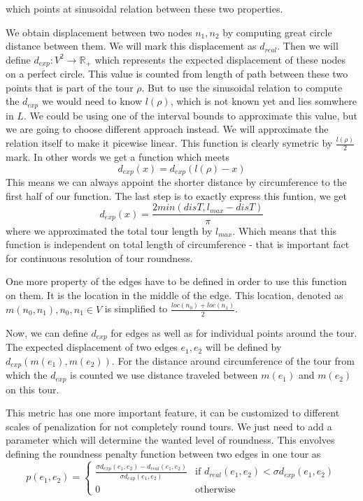 \documentclass{ctuthesis}
\begin{document}
which points at sinusoidal relation between these two properties.\par
We obtain displacement between two nodes \(n_1, n_2\) by computing great circle distance between them. We will mark this displacement as \(d_{real}\). Then we will define \(d_{exp}: V^2 \rightarrow \mathbb{R_+}\) which represents the expected displacement of these nodes on a perfect circle. This value is counted from length of path between these two points that is part of the tour \(\rho\). But to use the sinusoidal relation to compute the \(d_{exp}\) we would need to know \(l(\rho)\), which is not known yet and lies somwhere in \(L\). We could be using one of the interval bounds to approximate this value, but we are going to choose different approach instead. We will approximate the relation itself to make it picewise linear. This function is clearly symetric by \(\frac {l(\rho)} {2}\) mark. In other words we get a function which meets 
\begin{equation}
d_{exp}(x) = d_{exp}(l(\rho)-x)
\end{equation}
This means we can always appoint the shorter distance by circumference to the first half of our function. The last step is to exactly express this funtion, we get
\begin{equation} d_{exp}(x)=\frac{2 min(disT, l_{max}-disT)} {\pi}
\end{equation}
where we approximated the total tour length by \(l_{max}\). Which means that this function is independent on total length of circumference - that is important fact for continuous resolution of tour roundness.\par
One more property of the edges have to be defined in order to use this function on them.
It is the location in the middle of the edge. This location, denoted as \(m(n_0, n_1), n_0, n_1 \in V\) is simplified to \(\frac {loc(n_0)+loc(n_1)} 2\). \par
Now, we can define \(d_{exp}\) for edges as well as for individual points around the tour. The expected displacement of two edges \(e_1, e_2\) will be defined by \(d_{exp}(m(e_1), m(e_2))\). For the distance around circumference of the tour from which the \(d_{exp}\) is counted we use distance traveled between \(m(e_1)\) and \(m(e_2)\) on this tour. \par
This metric has one more important feature, it can be customized to different scales of penalization for not completely round tours. We just need to add a parameter which will determine the wanted level of roundness. This envolves defining the roundness penalty function between two edges in one tour as
\vbox{%
\begin{equation}
	p(e_1, e_2) = \begin{cases}
		\frac 
			{\sigma d_{exp}(e_1, e_2)-d_{real}(e_1, e_2)}
 			{\sigma d_{exp}(e_1, e_2)}
 		& \text{if } d_{real}(e_1, e_2) < \sigma d_{exp}(e_1, e_2) \\
		0  & \text{otherwise} 
	\end{cases}
\end{equation}
}
\end{document}
